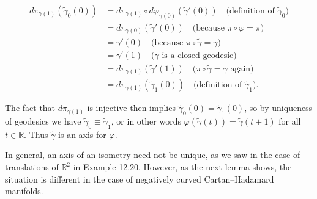 \begin{lemma}

\begin{align*}
d\pi_{\gamma(1)}(\tilde{\gamma}_0(0)) &= d\pi_{\gamma(1)} \circ d\varphi_{\gamma(0)}(\tilde{\gamma}'(0)) \quad \text{(definition of $\tilde{\gamma}_0$)} \\
&= d\pi_{\gamma(0)}(\tilde{\gamma}'(0)) \quad \text{(because $\pi \circ \varphi = \pi$)} \\
&= \gamma'(0) \quad \text{(because $\pi \circ \tilde{\gamma} = \gamma$)} \\
&= \gamma'(1) \quad \text{($\gamma$ is a closed geodesic)} \\
&= d\pi_{\gamma(1)}(\tilde{\gamma}'(1)) \quad \text{($\pi \circ \tilde{\gamma} = \gamma$ again)} \\
&= d\pi_{\gamma(1)}(\tilde{\gamma}_1(0)) \quad \text{(definition of $\tilde{\gamma}_1$)}.
\end{align*}

The fact that $d\pi_{\gamma(1)}$ is injective then implies $\tilde{\gamma}_0(0) = \tilde{\gamma}_1(0)$, so by uniqueness of geodesics we have $\tilde{\gamma}_0 \equiv \tilde{\gamma}_1$, or in other words $\varphi(\tilde{\gamma}(t)) = \tilde{\gamma}(t+1)$ for all $t \in \mathbb{R}$. Thus $\tilde{\gamma}$ is an axis for $\varphi$.
\end{lemma}

In general, an axis of an isometry need not be unique, as we saw in the case of translations of $\mathbb{R}^2$ in Example 12.20. However, as the next lemma shows, the situation is different in the case of negatively curved Cartan--Hadamard manifolds.

